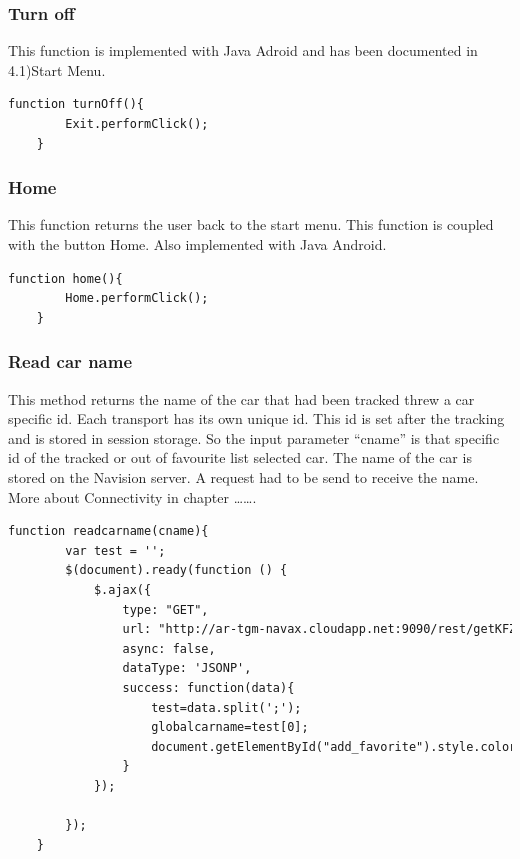 \subsubsection{Turn off}
This function is implemented with Java Adroid and has been documented in 4.1)Start Menu.
\\

\begin{lstlisting}[language=html, caption= 
start timer function,captionpos=b]
function turnOff(){
        Exit.performClick();
    }
\end{lstlisting}



\subsubsection{Home}
This function returns the user back to the start menu. This function is coupled with the button Home. Also implemented with Java Android.
\\

\begin{lstlisting}[language=html, caption= 
start timer function,captionpos=b]
function home(){
        Home.performClick();
    }
\end{lstlisting}


\subsubsection{Read car name}
This method returns the name of the car that had been tracked threw a car specific id. Each transport has its own unique id. This id is set after the tracking and is stored in session storage.  So the input parameter “cname” is that specific id of the tracked or out of favourite list selected car. The name of the car is stored on the Navision server. A request had to be send to receive the name. More about Connectivity in chapter …….
\\

\begin{lstlisting}[language=html, caption= 
start timer function,captionpos=b]
function readcarname(cname){
        var test = '';
        $(document).ready(function () {
            $.ajax({
                type: "GET",
                url: "http://ar-tgm-navax.cloudapp.net:9090/rest/getKFZInfo/"+cname+"/ac73f229f1fb88a8719e5f6d295bee45?callback=?",
                async: false,
                dataType: 'JSONP',
                success: function(data){
                    test=data.split(';');
                    globalcarname=test[0];
					document.getElementById("add_favorite").style.color="black";
                }
            });

        });
    }
\end{lstlisting}


